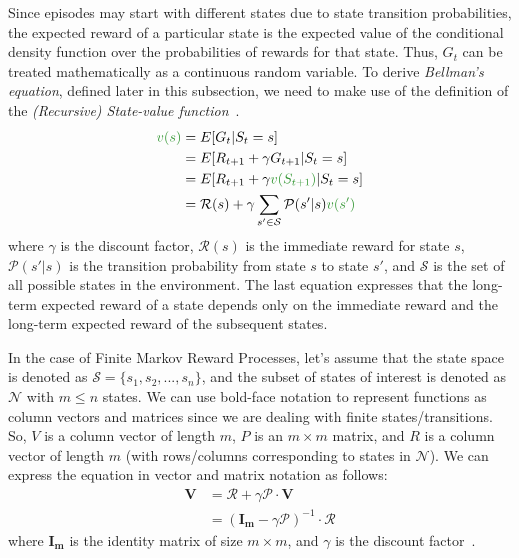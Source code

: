 \documentclass[../xlapes02]{subfiles}
\begin{document}
    Since episodes may start with different states due to state transition probabilities, the expected reward of a particular state is the expected value of the conditional density function over the probabilities of rewards for that state. Thus, $G_t$ can be treated mathematically as a continuous random variable.
    To derive \emph{Bellman's equation}, defined later in this subsection, we need to make use of the definition of the \emph{(Recursive) State-value function}~\cite{FITMT25127, rao2022foundations}.
    \begin{equation}
        \label{eq:state-value-function}
        \begin{split}
            \textcolor[RGB]{50,150,50}{v(s)}&=E[G_t|S_t=s]\\
            &=E[R_{t+1}+\gamma G_{t+1}|S_t=s]\\
            &=E[R_{t+1}+\gamma\textcolor[RGB]{50,150,50}{v(S_{t+1})}|S_t=s]\\
            &=\mathcal{R}(s)+\gamma\sum_{s'\in\mathcal{S}}\mathcal{P}(s'|s)\textcolor[RGB]{50,150,50}{v(s')}
        \end{split}
    \end{equation}
    where $\gamma$ is the discount factor, $\mathcal{R}(s)$ is the immediate reward for state $s$, $\mathcal{P}(s'|s)$ is the transition probability from state $s$ to state $s'$, and $\mathcal{S}$ is the set of all possible states in the environment. The last equation expresses that the long-term expected reward of a state depends only on the immediate reward and the long-term expected reward of the subsequent states.

    In the case of Finite Markov Reward Processes, let's assume that the state space is denoted as $\mathcal{S} = \{s_1, s_2, ..., s_n\}$, and the subset of states of interest is denoted as $\mathcal{N}$ with $m \leq n$ states. We can use bold-face notation to represent functions as column vectors and matrices since we are dealing with finite states/transitions. So, $V$ is a column vector of length $m$, $P$ is an $m \times m$ matrix, and $R$ is a column vector of length $m$ (with rows/columns corresponding to states in $\mathcal{N}$). We can express the equation in vector and matrix notation as follows:
    \begin{equation}
        \begin{split}
            \bm{V}&=\bm{\mathcal{R}}+\gamma \bm{\mathcal{P}}\cdot \bm{V}\\
            &=(\bm{I_m}-\gamma \bm{\mathcal{P}})^{-1}\cdot \bm{\mathcal{R}}
        \end{split}
    \end{equation}
    where $\bm{I_m}$ is the identity matrix of size $m\times m$, and $\gamma$ is the discount factor~\cite{rao2022foundations}.
\end{document}
